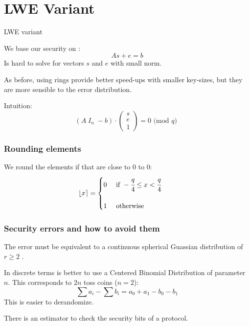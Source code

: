 \documentclass[presentation]{beamer}
\begin{document}
\section{LWE Variant}
\begin{frame}[label=lwe-variant]{LWE variant}

  We base our security on \cite{lwe-problem}:
  \[
    As + e = b
  \]
  Is hard to solve for vectors $s$ and $e$ with small norm.

  As before, using rings provide better speed-ups with 
  smaller key-sizes, \alert{but} they are more sensible 
  to the error distribution. \pause

  Intuition:
  \[
    (A \; I_n \;-b)\cdot \left( 
      \begin{array}{c}
        s 
        \\e 
        \\1 
      \end{array}
    \right) = 0 \text{ (mod $q$) }
  \]
\end{frame}
\begin{frame}[label=rounding]
  \frametitle{Rounding elements}
  We round the elements if that are close to $0$ to 0:
  \begin{equation}
    \lfloor x \rceil = \begin{cases}
      0 &\text{ if } -\cfrac{q}{4} \leq x < \cfrac{q}{4} \\
      \\
      1 &\text{ otherwise}
    \end{cases} \qquad
  \end{equation}
\end{frame}
\begin{frame}[label=security-errors-and-how-to-avoid-them]
  \frametitle{Security errors and how to avoid them}
  The error must be equivalent to a continuous spherical Guassian
  distribution of $r \geq 2$ \cite{how-not-to-instantiate}.

  In discrete terms is better to use a Centered Binomial
  Distribution of parameter $n$. This corresponds to $2n$ 
  toss coins ($n = 2$):
  \[
    \sum a_i - \sum b_i = a_0 + a_1 - b_0 - b_1
  \]
  This is easier to derandomize.
  \pause

  There is an estimator \cite{lattice-estimator} to check the
  security bits of a protocol.
\end{frame}
\end{document}
